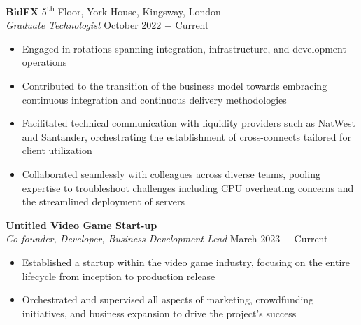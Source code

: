 \documentclass{article}
\begin{document}
\textbf{BidFX} \hfill 5\textsuperscript{th} Floor, York House, Kingsway, London\\
\textit{Graduate Technologist} \hfill October 2022 $-$ Current
\begin{itemize}
    \item Engaged in rotations spanning integration, infrastructure, and development operations
    \item Contributed to the transition of the business model towards embracing continuous integration and continuous delivery methodologies
    \item Facilitated technical communication with liquidity providers such as NatWest and Santander, orchestrating the establishment of cross-connects tailored for client utilization
    \item Collaborated seamlessly with colleagues across diverse teams, pooling expertise to troubleshoot challenges including CPU overheating concerns and the streamlined deployment of servers
\end{itemize} \medskip

\textbf{Untitled Video Game Start-up}\\
\textit{Co-founder, Developer, Business Development Lead} \hfill March 2023 $-$ Current
\begin{itemize}
    \item Established a startup within the video game industry, focusing on the entire lifecycle from inception to production release
    \item Orchestrated and supervised all aspects of marketing, crowdfunding initiatives, and business expansion to drive the project's success
\end{itemize} \medskip
\end{document}
